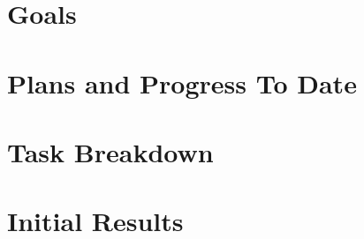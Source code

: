 \documentclass[11pt, letterpaper]{article}
\begin{document}
\section{Goals}


\section{Plans and Progress To Date}



\section{Task Breakdown}



\section{Initial Results}










\newpage



\end{document}
